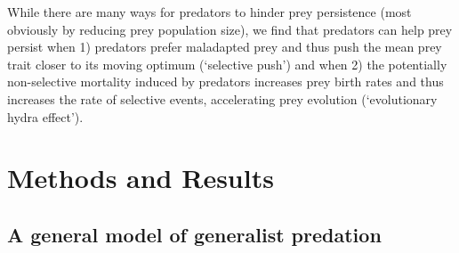 \documentclass[11pt]{article}
\begin{document}
While there are many ways for predators to hinder prey persistence (most obviously by reducing prey population size), we find that predators can help prey persist when 1) predators prefer maladapted prey and thus push the mean prey trait closer to its moving optimum (`selective push') and when 2) the potentially non-selective mortality induced by predators increases prey birth rates and thus increases the rate of selective events, accelerating prey evolution (`evolutionary hydra effect').

\section*{Methods and Results}

\subsection*{A general model of generalist predation}
\end{document}
